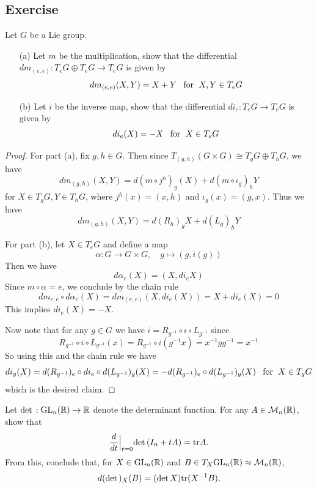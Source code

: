 \subsection{Exercise}
\begin{exercise}\label{Lie group operator diff}
Let $G$ be a Lie group.
\begin{itemize}
\item[(a)] Let $m$ be the multiplication, show that the differential $dm_{(e,e)}:T_eG\oplus T_eG\to T_eG$ is given by
\[dm_{(e,e)}(X,Y)=X+Y\hspace{8pt}\text{for}\hspace{6pt} X,Y\in T_eG\]
\item[(b)] Let $i$ be the inverse map, show that the differential $di_{e}:T_eG\to T_eG$ is given by
\[di_e(X)=-X\hspace{8pt}\text{for}\hspace{6pt} X\in T_eG\]
\end{itemize}
\end{exercise}
\begin{proof}
For part (a), fix $g,h\in G$. Then since $T_{(g,h)}(G\times G)\cong T_gG\oplus T_hG$, we have
\[dm_{(g,h)}(X,Y)=d(m\circ j^h)_g(X)+d(m\circ \iota_g)_hY\]
for $X\in T_gG,Y\in T_hG$, where $j^h(x)=(x,h)$ and $\iota_g(x)=(g,x)$. Thus we have
\[dm_{(g,h)}(X,Y)=d(R_h)_gX+d(L_g)_hY\]

For part (b), let $X\in T_eG$ and define a map
\[\alpha:G\to G\times G,\quad g\mapsto(g,i(g))\]
Then we have
\[d\alpha_e(X)=(X,di_eX)\]
Since $m\circ\alpha=e$, we conclude by the chain rule
\[dm_{e,e}\circ d\alpha_e(X)=dm_{(e,e)}(X,di_e(X))=X+di_e(X)=0\]
This implies $di_e(X)=-X$.\par
Now note that for any $g\in G$ we have $i=R_{g^{-1}}\circ i\circ L_{g^{-1}}$ since
\[R_{g^{-1}}\circ i\circ L_{g^{-1}}(x)=R_{g^{-1}}\circ i(g^{-1}x)=x^{-1}gg^{-1}=x^{-1}\]
So using this and the chain rule we have
\[di_g(X)=d(R_{g^{-1}})_e\circ di_e\circ d(L_{g^{-1}})_g(X)=-d(R_{g^{-1}})_e\circ d(L_{g^{-1}})_g(X)\hspace{8pt}\text{for}\hspace{6pt} X\in T_gG\]
which is the desired claim.
\end{proof}
\begin{exercise}\label{det diff}
Let $\mathrm{det}\,:\mathrm{GL}_n(\mathbb{R})\to\mathbb{R}$ denote the determinant function. For any $A\in\mathcal{M}_n(\mathbb{R})$, show that
\[\frac{d}{dt}\Big|_{t=0}\mathrm{det}\,(I_n+tA)=\mathrm{tr} A.\]
From this, conclude that, for $X\in\mathrm{GL}_n(\mathbb{R})$ and $B\in T_X\mathrm{GL}_n(\mathbb{R})\approx\mathcal{M}_n(\mathbb{R})$,
\[d(\mathrm{det}\,)_X(B)=(\mathrm{det}\, X)\mathrm{tr}(X^{-1}B).\]
\end{exercise}
